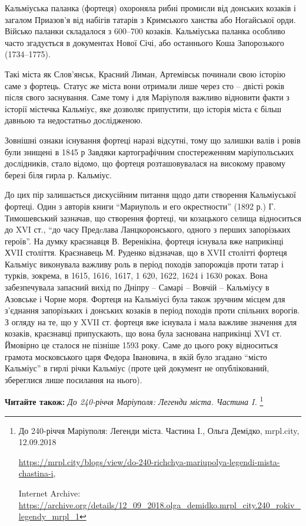 Кальміуська паланка (фортеця) охороняла рибні промисли від донських козаків і
загалом Приазов'я від набігів татарів з Кримського ханства або Ногайської орди.
Військо паланки складалося з 600–700 козаків. Кальміуська паланка особливо
часто згадується в документах Нової Січі, або останнього Коша Запорозького
(1734–1775).

Такі міста як Слов'янськ, Красний Лиман, Артемівськ починали свою історію саме
з фортець. Статус же міста вони отримали лише через сто – двісті років після
свого заснування. Саме тому і для Маріуполя важливо відновити факти з історії
містечка Кальміус, яке дозволяє припустити, що історія міста є більш давньою та
недостатньо дослідженою.

Зовнішні ознаки існування фортеці наразі відсутні, тому що залишки валів і
ровів були знищені в 1845 р Завдяки картографічним спостереженням
маріупольських дослідників, стало відомо, що фортеця розташовувалася на
високому правому березі біля гирла р. Кальміус.

До цих пір залишається дискусійним питання щодо дати створення Кальміуської
фортеці. Один з авторів книги \enquote{Мариуполь и его окрестности} (1892 р.)
Г.  Тимошевський зазначав, що створення фортеці, чи козацького селища
відноситься до XVI ст., \enquote{до часу Предcлава Ланцкоронського, одного з
перших запорізьких героїв}. На думку краєзнавця В. Веренікіна, фортеця існувала
вже наприкінці ХVII століття. Краєзнавець М. Руденко відзначав, що в XVII
столітті фортеця Кальміус виконувала важливу роль в період походів запорожців
проти татар і турків, зокрема, в 1615, 1616, 1617, 1 620, 1622, 1624 і 1630
роках. Вона забезпечувала запасний вихід по Дніпру – Самарі – Вовчій –
Кальміусу в Азовське і Чорне моря. Фортеця на Кальміусі була також зручним
місцем для з'єднання запорізьких і донських козаків в період походів проти
спільних ворогів. З огляду на те, що у XVII ст. фортеця вже існувала і мала
важливе значення для козаків, краєзнавці припускають, що вона була заснована
наприкінці XVI ст.  Ймовірно це сталося не пізніше 1593 року. Саме до цього
року відноситься грамота московського царя Федора Івановича, в якій було
згадано \enquote{місто Кальміус} в гирлі річки Кальміус (проте цей документ не
опублікований, збереглися лише посилання на нього).

\textbf{Читайте також:} \emph{До 240-річчя Маріуполя: Легенди міста. Частина I.}%
\footnote{До 240-річчя Маріуполя: Легенди міста. Частина I., Ольга Демідко, mrpl.city, 12.09.2018 \par 
\url{https://mrpl.city/blogs/view/do-240-richchya-mariupolya-legendi-mista-chastina-i}, \par
Internet Archive: \url{https://archive.org/details/12_09_2018.olga_demidko.mrpl_city.240_rokiv_legendy_mrpl_1}}

